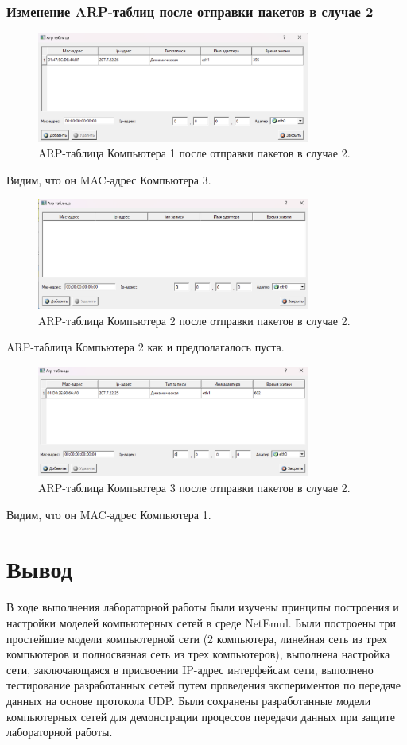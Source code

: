 \documentclass[12pt,onecolumn]{article}
\begin{document}
\subsubsection{Изменение ARP-таблиц после отправки пакетов в случае 2}
\begin{figure}[H]
  \centering
  \includegraphics[width=0.8\textwidth]{image/part3/arp-2-1.png}
  \caption{ARP-таблица Компьютера 1 после отправки пакетов в случае 2.}
\end{figure}
Видим, что он MAC-адрес Компьютера 3.
\begin{figure}[H]
  \centering
  \includegraphics[width=0.8\textwidth]{image/part3/arp-2-2.png}
  \caption{ARP-таблица Компьютера 2 после отправки пакетов в случае 2.}
\end{figure}
ARP-таблица Компьютера 2 как и предполагалось пуста.
\begin{figure}[H]
  \centering
  \includegraphics[width=0.8\textwidth]{image/part3/arp-2-3.png}
  \caption{ARP-таблица Компьютера 3 после отправки пакетов в случае 2.}
\end{figure}
Видим, что он MAC-адрес Компьютера 1.
\section{Вывод}
В ходе выполнения лабораторной работы были изучены принципы построения и настройки моделей компьютерных сетей в среде NetEmul. Были построены три простейшие модели компьютерной сети (2 компьютера, линейная сеть из трех компьютеров и полносвязная сеть из трех компьютеров), выполнена настройка сети, заключающаяся в присвоении IP-адрес интерфейсам сети, выполнено тестирование разработанных сетей путем проведения экспериментов по передаче данных на основе протокола UDP. Были сохранены разработанные модели компьютерных сетей для демонстрации процессов передачи данных при защите лабораторной работы.
\end{document}

